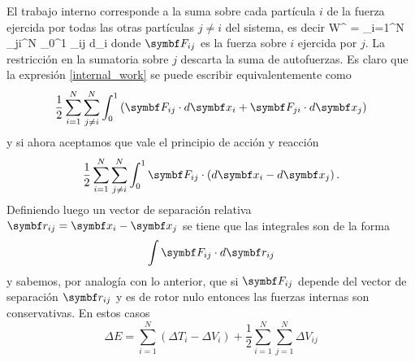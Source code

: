 \documentclass[10pt,oneside]{CBFT_book}
\begin{document}
El trabajo interno corresponde a la suma sobre cada partícula $i$ de la fuerza ejercida por todas las otras partículas 
$j \neq i$ del sistema, es decir
\be
	W^{} = \sum_{i=1}^N \sum_{j\neq i}^N \int_0^1 _{ij} \cdot d_i
	\label{internal_work}
\ee
donde $\vb{F}_{ij} $ es la fuerza sobre $i$ ejercida por $j$. La restricción en la sumatoria sobre $j$ descarta la suma 
de autofuerzas. Es claro que la expresión \eqref{internal_work} se puede escribir equivalentemente como
\[
	\frac{1}{2} \sum_{i=1}^N \sum_{j\neq i}^N \int_0^1 
	\left( \vb{F}_{ij} \cdot d\vb{x}_i + \vb{F}_{ji} \cdot d\vb{x}_j \right) 
\]
%
y si ahora aceptamos que vale el principio de acción y reacción
\[
	\frac{1}{2} \sum_{i=1}^N \sum_{j\neq i}^N \int_0^1 
	\vb{F}_{ij} \cdot \left(d\vb{x}_i - d\vb{x}_j \right) .
\]
Definiendo luego un vector de separación relativa $ \vb{r}_{ij} = \vb{x}_i - \vb{x}_j $ se tiene que las integrales son 
de la forma 
\[
	\int \vb{F}_{ij} \cdot d\vb{r}_{ij}
\]
y sabemos, por analogía con lo anterior, que si $\vb{F}_{ij}$ depende del vector de separación $ \vb{r}_{ij} $ y es de 
rotor nulo entonces las fuerzas internas son conservativas.
En estos casos
\[
	\Delta E = \sum_{i=1}^N ( \Delta T_i - \Delta V_i ) + \frac{1}{2} \sum_{i=1}^N \sum_{j=1}^N \Delta V_{ij}
\]
\end{document}
